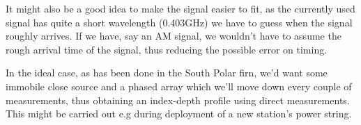 It might also be a good idea to make the signal easier to fit, as the currently
used signal has quite a short wavelength (0.403GHz) we have to guess when the 
signal roughly arrives. If we have, say an AM signal, we wouldn't have to assume
the rough arrival time of the signal, thus reducing the possible error on timing.

In the ideal case, as has been done in the South Polar firn\cite{kravchenko_besson_meyers_2004}, we'd want some immobile close source and a phased array which we'll
move down every couple of measurements, thus obtaining an index-depth profile
using direct measurements. This might be carried out e.g during deployment
of a new station's power string.
